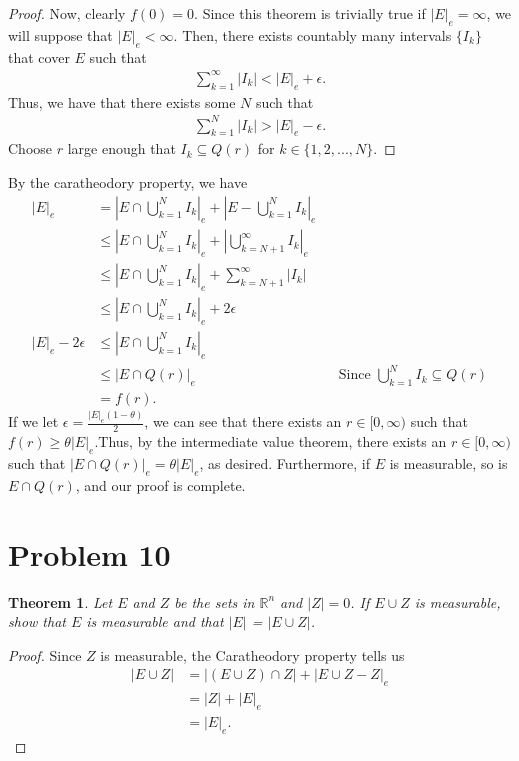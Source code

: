 \documentclass[10pt,a4paper]{article}
\theoremstyle{theorem}
\newtheorem{theorem}{Theorem}
\theoremstyle{definition}
\begin{document}
\begin{proof}
Now, clearly $f(0) = 0$. Since this theorem is trivially true if $|E|_e = \infty$, we will suppose that $|E|_e < \infty$. Then, there exists countably many intervals $\{I_k\}$ that cover $E$ such that
\begin{align*}
\sum_{k=1}^\infty |I_k| < |E|_e + \epsilon.
\end{align*}
Thus, we have that there exists some $N$ such that 
\begin{align*}
\sum_{k=1}^N |I_k| > |E|_e - \epsilon.
\end{align*}
Choose $r$ large enough that $I_k \subseteq Q(r)$ for $k \in \{1, 2, ..., N\}$.
\end{proof}
By the caratheodory property, we have
\begin{align*}
|E|_e &= |E \cap \bigcup_{k=1}^N I_k|_e + |E - \bigcup_{k=1}^N I_k |_e\\
&\leq |E \cap \bigcup_{k=1}^N I_k|_e + |\bigcup_{k=N+1}^\infty I_k |_e\\
&\leq |E \cap \bigcup_{k=1}^N I_k|_e + \sum_{k=N+1}^\infty |I_k|\\
&\leq |E \cap \bigcup_{k=1}^N I_k|_e + 2 \epsilon\\
|E|_e - 2 \epsilon &\leq |E \cap \bigcup_{k=1}^N I_k|_e\\
&\leq |E \cap Q(r)|_e &&\text{Since } \bigcup_{k=1}^N I_k \subseteq Q(r)\\
&= f(r).
\end{align*}
If we let $\epsilon = \frac{|E|_e(1 - \theta)}{2}$, we can see that there exists an $r \in [0, \infty)$ such that $f(r) \geq \theta |E|_e$.Thus, by the intermediate value theorem, there exists an $r \in [0, \infty)$ such that $|E \cap Q(r)|_e = \theta |E|_e$, as desired. Furthermore, if $E$ is measurable, so is $E \cap Q(r)$, and our proof is complete.

\section*{Problem 10}
\begin{theorem}
Let $E$ and $Z$ be the sets in $\mathbb{R}^n$ and $|Z| = 0$. If $E \cup Z$ is measurable, show that $E$ is measurable and that $|E|$ = $|E \cup Z|$.
\end{theorem}

\begin{proof}
Since $Z$ is measurable, the Caratheodory property tells us
\begin{align*}
|E \cup Z| &= |(E \cup Z) \cap Z| + |E \cup Z - Z|_e\\
&= |Z| + |E|_e\\
&= |E|_e.
\end{align*}
\end{proof}
\end{document}
